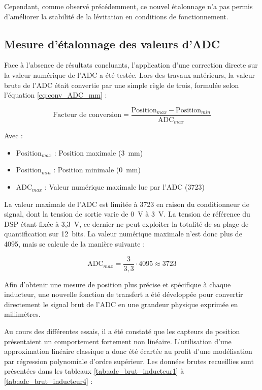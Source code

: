 Cependant, comme observé précédemment, ce nouvel étalonnage n'a pas permis d'améliorer la stabilité de la lévitation en conditions de fonctionnement.

\subsection{Mesure d'étalonnage des valeurs d'ADC}
Face à l'absence de résultats concluants, l'application d'une correction directe sur la valeur numérique de l'ADC a été testée. Lors des travaux antérieurs, la valeur brute de l'ADC était convertie par une simple règle de trois, formulée selon l'équation \ref{eq:conv_ADC_mm} :

\begin{equation}
    \text{Facteur de conversion} = \frac{\text{Position}_{max} - \text{Position}_{min}}{\text{ADC}_{max}}
    \label{eq:conv_ADC_mm}
\end{equation}

Avec :
\begin{itemize}
    \item $\text{Position}_{max}$ : Position maximale (3~mm)
    \item $\text{Position}_{min}$ : Position minimale (0~mm)
    \item $\text{ADC}_{max}$ : Valeur numérique maximale lue par l'ADC (3723)
\end{itemize}

La valeur maximale de l'ADC est limitée à 3723 en raison du conditionneur de signal, dont la tension de sortie varie de 0~V à 3~V. La tension de référence du DSP étant fixée à 3,3~V, ce dernier ne peut exploiter la totalité de sa plage de quantification sur 12~bits. La valeur numérique maximale n'est donc plus de 4095, mais se calcule de la manière suivante :

\begin{equation}
    \text{ADC}_{max} = \frac{3}{3,3}\cdot 4095 \approx 3723
\end{equation}

Afin d'obtenir une mesure de position plus précise et spécifique à chaque inducteur, une nouvelle fonction de transfert a été développée pour convertir directement le signal brut de l'ADC en une grandeur physique exprimée en millimètres.

Au cours des différentes essais, il a été constaté que les capteurs de position présentaient un comportement fortement non linéaire. L'utilisation d'une approximation linéaire classique a donc été écartée au profit d'une modélisation par régression polynomiale d'ordre supérieur. Les données brutes recueillies sont présentées dans les tableaux \ref{tab:adc_brut_inducteur1} à \ref{tab:adc_brut_inducteur4} :

